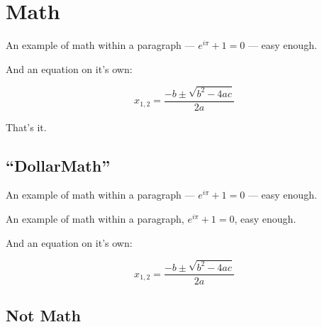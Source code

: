 
\def\mytitle{MultiMarkdown Math Example}


\part{Math}
\label{math}

An example of math within a paragraph --- \({e}^{i\pi }+1=0\) --- easy
enough.

And an equation on it's own:

\[ {x}_{1,2}=\frac{-b\pm \sqrt{{b}^{2}-4ac}}{2a} \]

That's it.

\chapter{``DollarMath''}
\label{dollarmath}

An example of math within a paragraph --- \({e}^{i\pi }+1=0\) --- easy
enough.

An example of math within a paragraph, \({e}^{i\pi }+1=0\), easy
enough.

And an equation on it's own:

\[{x}_{1,2}=\frac{-b\pm \sqrt{{b}^{2}-4ac}}{2a}\]

\chapter{Not Math}
\label{notmath}

